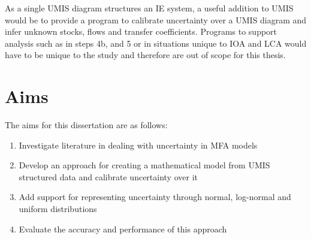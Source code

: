 \documentclass[ %
                    author={Tom Jager},
                supervisor={Dr. Daniel Schien},
                    degree={MEng},
                     title={A Bayesian Inference Engine for Calibrating Uncertainty over UMIS Structured MFA Systems},
                  subtitle={},
                      type={research},
                      year={2019} ]{dissertation}
\begin{document}
As a single UMIS diagram structures an IE system, a useful addition to UMIS would be to provide a program to calibrate uncertainty over a UMIS diagram and infer unknown stocks, flows and transfer coefficients. Programs to support analysis such as in steps 4b, and 5 or in situations unique to IOA and LCA would have to be unique to the study and therefore are out of scope for this thesis.

\section{Aims}
The aims for this dissertation are as follows:

\begin{enumerate}
    \item Investigate literature in dealing with uncertainty in MFA models
    \item Develop an approach for creating a mathematical model from UMIS structured data and calibrate uncertainty over it
    \item Add support for representing uncertainty through normal, log-normal and uniform distributions
    \item Evaluate the accuracy and performance of this approach
\end{enumerate}
\end{document}
